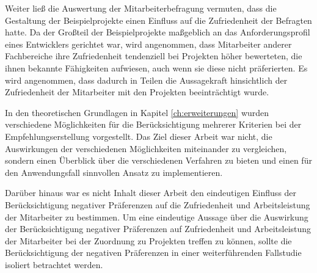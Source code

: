 
Weiter ließ die Auswertung der Mitarbeiterbefragung vermuten, dass die Gestaltung der Beispielprojekte einen Einfluss auf die Zufriedenheit der Befragten hatte.
Da der Großteil der Beispielprojekte maßgeblich an das Anforderungsprofil eines Entwicklers gerichtet war, wird angenommen, dass Mitarbeiter anderer Fachbereiche ihre Zufriedenheit tendenziell bei Projekten höher bewerteten, die ihnen bekannte Fähigkeiten aufwiesen, auch wenn sie diese nicht präferierten.
Es wird angenommen, dass dadurch in Teilen die Aussagekraft hinsichtlich der Zufriedenheit der Mitarbeiter mit den Projekten beeinträchtigt wurde.

In den theoretischen Grundlagen in Kapitel \ref{ch:erweiterungen} wurden verschiedene Möglichkeiten für die Berücksichtigung mehrerer Kriterien bei der Empfehlungserstellung vorgestellt.
Das Ziel dieser Arbeit war nicht, die Auswirkungen der verschiedenen Möglichkeiten miteinander zu vergleichen, sondern einen Überblick über die verschiedenen Verfahren zu bieten und einen für den Anwendungsfall sinnvollen Ansatz zu implementieren.

Darüber hinaus war es nicht Inhalt dieser Arbeit den eindeutigen Einfluss der Berücksichtigung negativer Präferenzen auf die Zufriedenheit und Arbeitsleistung der Mitarbeiter zu bestimmen.
Um eine eindeutige Aussage über die Auswirkung der Berücksichtigung negativer Präferenzen auf Zufriedenheit und Arbeitsleistung der Mitarbeiter bei der Zuordnung zu Projekten treffen zu können, sollte die Berücksichtigung der negativen Präferenzen in einer weiterführenden Fallstudie isoliert betrachtet werden.

